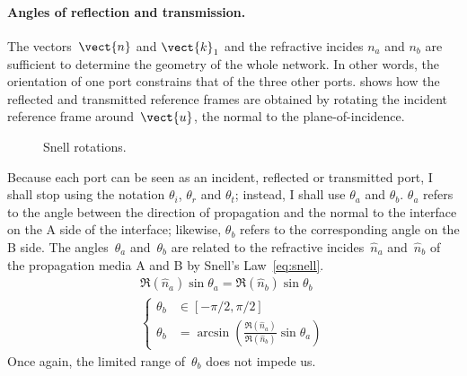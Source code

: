\paragraph{Angles of reflection and transmission.}
The vectors~$\vect{n}$ and $\vect{k}_1$ and the refractive incides $n_a$ and $n_b$ are sufficient to determine the geometry of the whole network.
In other words, the orientation of one port constrains that of the three other ports.
 shows how the reflected and transmitted reference frames are obtained by rotating the incident reference frame around~$\vect{u}$, the normal to the plane-of-incidence.
\begin{figure}[hbtp]
    \centering
    \caption{\label{fig:snell_rotations}Snell rotations.}
\end{figure}
Because each port can be seen as an incident, reflected or transmitted port, I shall stop using the notation $\theta_i$, $\theta_r$ and $\theta_t$;
instead, I shall use $\theta_a$ and $\theta_b$.
$\theta_a$ refers to the angle between the direction of propagation and the normal to the interface on the A side of the interface;
likewise, $\theta_b$ refers to the corresponding angle on the B side.
The angles~$\theta_a$ and~$\theta_b$ are related to the refractive incides~$\hat{n}_a$ and~$\hat{n}_b$ of the propagation media A and B by Snell's Law~\eqref{eq:snell}.
\begin{gather}
    \Re(\hat{n}_a) \sin \theta_a = \Re(\hat{n}_b) \sin \theta_b
    \label{eq:snell}
    \\
    \left\lbrace
        \begin{aligned}
            \theta_b &\in [-\pi/2, \pi/2]
            \\
            \theta_b &= \arcsin
            \left(
                \frac{\Re(\hat{n}_a)}{\Re(\hat{n}_b)}
                \sin \theta_a
            \right)
        \end{aligned}
    \right.
    \label{eq:snell_thetab}
\end{gather}
Once again, the limited range of~$\theta_b$ does not impede us.

